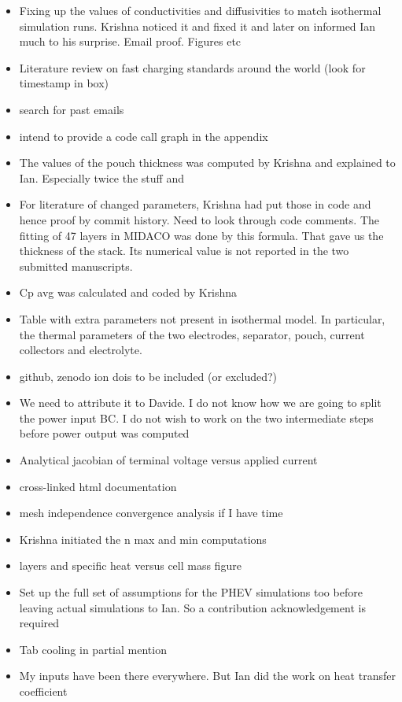 \begin{itemize}
    \item Fixing up the values of conductivities and diffusivities to match isothermal simulation runs. Krishna noticed it and fixed it and later on informed Ian much to his surprise. Email proof. Figures etc
    \item Literature review on fast charging standards around the world (look for timestamp in box)
    \item search for past emails
    \item intend to provide a code call graph in the appendix
    \item The values of the pouch thickness was computed by Krishna and explained to Ian. Especially twice the stuff and
    \item For literature of changed parameters, Krishna had put those in code and hence proof by commit history. Need to look through code comments. The fitting of 47 layers in MIDACO was done by this formula. That gave us the thickness of the stack. Its numerical value is not reported in the two submitted manuscripts.
    \item Cp avg was calculated and coded by Krishna
    \item Table with extra parameters not present in isothermal model. In particular, the thermal parameters of the two electrodes, separator, pouch, current collectors and electrolyte.
    \item github, zenodo ion dois to be included (or excluded?)
    \item We need to attribute it to Davide. I do not know how we are going to split the power input BC. I do not wish to work on the two intermediate steps before power output was computed
    \item Analytical jacobian of terminal voltage versus applied current
    \item cross-linked html documentation
    \item mesh independence convergence analysis if I have time
    \item Krishna initiated the n max and min computations
    \item layers and specific heat versus cell mass figure
    \item Set up the full set of assumptions for the PHEV simulations too before leaving actual simulations to Ian. So a contribution acknowledgement is required
    \item Tab cooling in partial mention
    \item My inputs have been there everywhere. But Ian did the work on heat transfer coefficient
\end{itemize}

